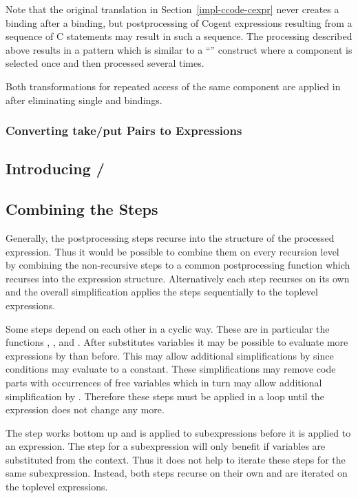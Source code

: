 Note that the original translation in Section~\ref{impl-ccode-cexpr} never creates a  binding after a  binding,
but postprocessing of Cogent expressions resulting from a sequence of C statements may result in such a sequence. The processing
described above results in a pattern which is similar to a ``'' construct where a component is selected once and then
processed several times.

Both transformations for repeated access of the same component are applied in  after eliminating single 
and  bindings.

\subsubsection{Converting take/put Pairs to  Expressions}

\subsection{Introducing /}
\label{impl-post-ref}


\subsection{Combining the Steps}
\label{impl-post-combine}

Generally, the postprocessing steps recurse into the structure of the processed expression. Thus it would be possible to combine them
on every recursion level by combining the non-recursive steps to a common postprocessing function which recurses into the expression
structure. Alternatively each step recurses on its own and the overall simplification applies the steps sequentially to the toplevel
expressions.

Some steps depend on each other in a cyclic way. These are in particular the functions , , and .
After  substitutes variables it may be possible to evaluate more expressions by  than before. This may
allow additional simplifications by  since conditions may evaluate to a constant. These simplifications may remove code parts 
with occurrences of free variables which in turn may allow additional simplification by . Therefore these steps must 
be applied in a loop until the expression does not change any more.

The  step works bottom up and is applied to subexpressions before it is applied to an expression. The  step 
for a subexpression will only benefit if variables are substituted from the context. Thus it does not help to iterate these steps for
the same subexpression. Instead, both steps recurse on their own and are iterated on the toplevel expressions.

